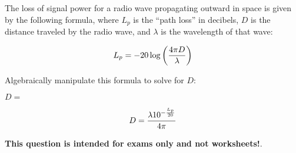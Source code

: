 

The loss of signal power for a radio wave propagating outward in space is given by the following formula, where $L_p$ is the ``path loss'' in decibels, $D$ is the distance traveled by the radio wave, and $\lambda$ is the wavelength of that wave:
 
$$L_p = -20 \log \left({4 \pi D \over \lambda}\right)$$

Algebraically manipulate this formula to solve for $D$:

\vskip 20pt

$D = $







$$D = {\lambda 10^{-{L_p \over 20}} \over 4 \pi}$$







{\bf This question is intended for exams only and not worksheets!}.



